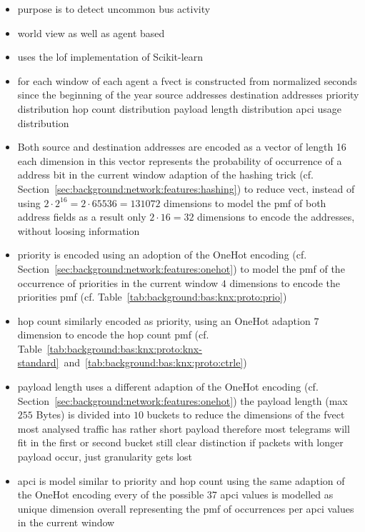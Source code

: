\begin{itemize}
	\item purpose is to detect uncommon bus activity
	\item world view as well as agent based
	\item uses the \gls{lof} implementation of Scikit-learn \parencite{Pedregosa2011}
	
	\item for each window of each agent a \gls{fvect} is constructed from
		\subitem normalized seconds since the beginning of the year
		\subitem source addresses
		\subitem destination addresses
		\subitem priority distribution
		\subitem hop count distribution
		\subitem payload length distribution
		\subitem \gls{apci} usage distribution
	\item Both source and destination addresses are encoded as a vector of length 16
		\subitem each dimension in this vector represents the probability of occurrence of a address bit in the current window
		\subitem adaption of the hashing trick (cf. Section~\ref{sec:background:network:features:hashing})
		\subitem to reduce \gls{vect}, instead of using $2 \cdot 2^16 = 2 \cdot 65536 = 131072$ dimensions to model the \gls{pmf} of both address fields
		\subitem as a result only $2 \cdot 16 = 32$ dimensions to encode the addresses, without loosing information
	\item priority is encoded using an adoption of the OneHot encoding (cf. Section~\ref{sec:background:network:features:onehot}) to model the \gls{pmf} of the occurrence of priorities in the current window
		\subitem $4$ dimensions to encode the priorities \gls{pmf} (cf. Table~\ref{tab:background:bas:knx:proto:prio})
	\item hop count similarly encoded as priority, using an OneHot adaption
		\subitem $7$ dimension to encode the hop count \gls{pmf} (cf. Table~\ref{tab:background:bas:knx:proto:knx-standard}~and~\ref{tab:background:bas:knx:proto:ctrle})
	\item payload length uses a different adaption of the OneHot encoding (cf. Section~\ref{sec:background:network:features:onehot})
		\subitem the payload length (max $255$ Bytes) is divided into $10$ buckets to reduce the dimensions of the \gls{fvect}
		\subitem most analysed traffic has rather short payload
		\subitem therefore most telegrams will fit in the first or second bucket
		\subitem still clear distinction if packets with longer payload occur, just granularity gets lost
	\item \gls{apci} is model similar to priority and hop count using the same adaption of the OneHot encoding
		\subitem every of the possible \alert{37}  \gls{apci} values is modelled as unique dimension
		\subitem overall representing the \gls{pmf} of occurrences per \gls{apci} values in the current window
		

\end{itemize}
